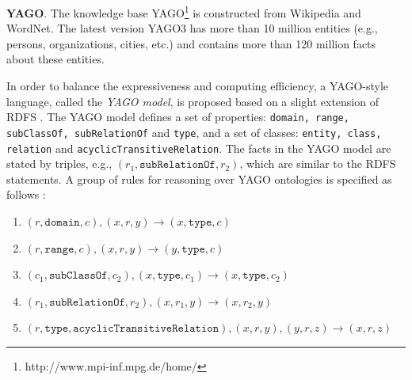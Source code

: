 \textbf{YAGO}. The knowledge base YAGO\footnote{http://www.mpi-inf.mpg.de/home/}
is constructed from Wikipedia and WordNet. The latest version
YAGO3 \cite{MahdisoltaniBS15} has more than 10 million entities
(e.g., persons, organizations, cities, etc.)
and contains more than 120 million facts about these entities.

In order to balance the expressiveness and computing efficiency,
a YAGO-style language, called the \emph{YAGO model}, is proposed based on
a slight extension of RDFS \cite{SuchanekKW08}. The YAGO model defines
a set of properties: \texttt{domain, range, subClassOf, subRelationOf} and \texttt{type},
and a set of classes: \texttt{entity, class, relation} and \texttt{acyclicTransitiveRelation}.
The facts in the YAGO model are stated by triples, e.g., $(r_1,
\texttt{subRelationOf}, r_2)$,
which are similar to the RDFS statements.
A group of rules for reasoning over YAGO ontologies
is specified as follows \cite{SuchanekKW08}:
\begin{enumerate}[leftmargin=8ex,label=(\arabic*),ref=\arabic*]
  \item $(r,\texttt{domain}, c), (x, r, y) \rightarrow (x,
    \texttt{type}, c)$\label{yago:r1}
  \item $(r,\texttt{range}, c), (x, r, y) \rightarrow (y,
    \texttt{type}, c)$\label{yago:r2}
  \item $(c_1, \texttt{subClassOf}, c_2), (x, \texttt{type}, c_1)
    \rightarrow (x, \texttt{type}, c_2)$\label{yago:r3}
  \item $(r_1, \texttt{subRelationOf}, r_2), (x, r_1, y) \rightarrow
    (x, r_2, y)$\label{yago:r4}
  \item $(r, \texttt{type}, \texttt{acyclicTransitiveRelation}), (x,
    r, y), (y, r, z) \rightarrow (x, r, z)$\label{yago:r5}
\end{enumerate}

